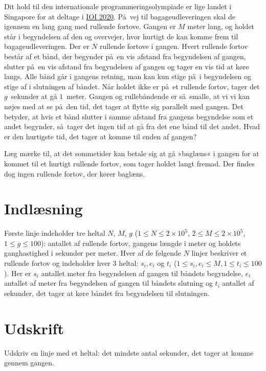 
Dit hold til den internationale programmeringsolympiade er lige landet i Singapore for at deltage i
 \href{https://ioi2020.sg/}{IOI 2020}.
På vej til bagageudleveringen skal de igennem en lang gang med rullende fortove.
Gangen er $M$ meter lang, og holdet står i begyndelsen af den og overvejer, hvor hurtigt de kan komme frem til bagageudleveringen. 
Der er $N$ rullende fortove i gangen.
Hvert rullende fortov består af et bånd, der begynder på en vis afstand fra begyndelsen af gangen, slutter på en vis afstand fra begyndelsen af gangen og tager en vis tid at køre langs.
Alle bånd går i gangens retning, man kan kun stige på i begyndelsen og stige af i slutningen af båndet.
Når holdet ikke er på et rullende fortov, tager det $g$~sekunder at gå $1$~meter.
Gangen og rullebåndende er så smalle, at vi vi kan nøjes med at se på den tid, det tager at flytte sig parallelt med gangen.
Det betyder, at hvis et bånd slutter i samme afstand fra gangens begyndelse som et andet begynder, så tager det ingen tid at gå fra det ene bånd til det andet.
Hvad er den hurtigste tid, det tager at komme til enden af gangen?

Læg mærke til, at det sommetider kan betale sig at gå »baglæns« i gangen for at kommet til et hurtigt rullende fortov, som tager holdet langt fremad.
Der findes dog ingen rullende fortov, der kører baglæns.

\section*{Indlæsning}
Første linje indeholder tre heltal $N$, $M$, $g$ ($1 \le N \le 2 \times 10^5$, $2 \le M \le 2 \times 10^5$, $1 \le g \le 100$):
antallet af rullende fortov, gangens længde i meter og holdets ganghastighed i sekunder per meter.
Hver af de følgende $N$ linjer beskriver et rullende fortov og indeholder hver 3 heltal: $s_i, e_i$ og $t_i$
($1\leq s_i,e_i\leq M,1\leq t_i\leq100$).
Her er $s_i$  antallet meter fra begyndelsen af gangen til båndets begyndelse, $e_i$ antallet af meter fra begyndelsen af gangen til båndets slutning og $t_i$ antallet af sekunder, det tager at køre båndet fra begyndelsen til slutningen.

\section*{Udskrift}
Udskriv en linje med et heltal: det mindste antal sekunder, det tager at komme gennem gangen.

